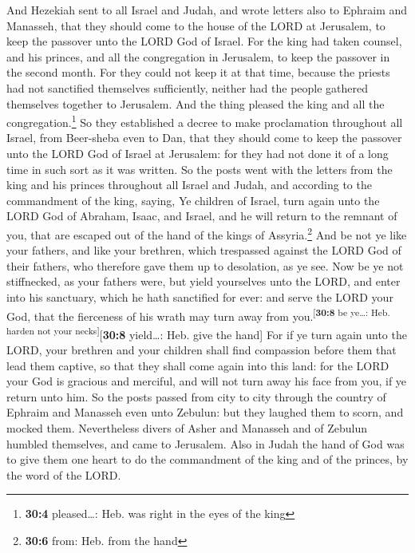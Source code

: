  And Hezekiah sent to all Israel and Judah, and wrote
letters also to Ephraim and Manasseh, that they should come to the house
of the LORD at Jerusalem, to keep the passover unto the LORD God of
Israel.  For the king had taken counsel, and his princes,
and all the congregation in Jerusalem, to keep the passover in the
second month.  For they could not keep it at that time,
because the priests had not sanctified themselves sufficiently, neither
had the people gathered themselves together to Jerusalem. 
And the thing pleased the king and all the congregation.\footnote{\textbf{30:4}
  pleased\ldots: Heb. was right in the eyes of the king} 
So they established a decree to make proclamation throughout all Israel,
from Beer-sheba even to Dan, that they should come to keep the passover
unto the LORD God of Israel at Jerusalem: for they had not done it of a
long time in such sort as it was written.  So the posts
went with the letters from the king and his princes throughout all
Israel and Judah, and according to the commandment of the king, saying,
Ye children of Israel, turn again unto the LORD God of Abraham, Isaac,
and Israel, and he will return to the remnant of you, that are escaped
out of the hand of the kings of Assyria.\footnote{\textbf{30:6} from:
  Heb. from the hand}  And be not ye like your fathers,
and like your brethren, which trespassed against the LORD God of their
fathers, who therefore gave them up to desolation, as ye see.
 Now be ye not stiffnecked, as your fathers were, but
yield yourselves unto the LORD, and enter into his sanctuary, which he
hath sanctified for ever: and serve the LORD your God, that the
fierceness of his wrath may turn away from
you.\textsuperscript{{[}\textbf{30:8} be ye\ldots: Heb. harden not your
necks{]}}{[}\textbf{30:8} yield\ldots: Heb. give the hand{]}
 For if ye turn again unto the LORD, your brethren and
your children shall find compassion before them that lead them captive,
so that they shall come again into this land: for the LORD your God is
gracious and merciful, and will not turn away his face from you, if ye
return unto him.  So the posts passed from city to city
through the country of Ephraim and Manasseh even unto Zebulun: but they
laughed them to scorn, and mocked them.  Nevertheless
divers of Asher and Manasseh and of Zebulun humbled themselves, and came
to Jerusalem.  Also in Judah the hand of God was to give
them one heart to do the commandment of the king and of the princes, by
the word of the LORD.

